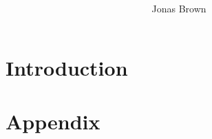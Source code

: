 \documentclass[9pt]{extreport}
\title{
    \begin{center}
        \reallybigtenb{MTH2005}

        \reallybigtenb{Case Study 2}
    \end{center}
}
\author{Jonas Brown}
\date{}
\begin{document}
    \maketitle

    \chapter{Introduction}\label{ch:introduction}
    

    

    \chapter{Appendix}\label{ch:appendix}
    
\end{document}
